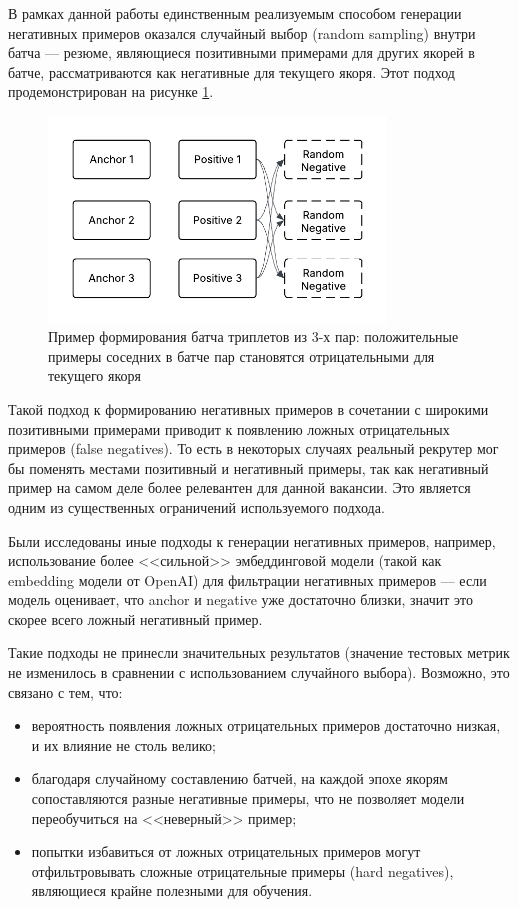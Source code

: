 \documentclass[14pt]{mmcs_article}
\begin{document}
В рамках данной работы единственным реализуемым способом генерации негативных примеров оказался случайный выбор (random sampling) внутри батча --- резюме, являющиеся позитивными примерами для других якорей в батче, рассматриваются как негативные для текущего якоря. Этот подход продемонстрирован на рисунке \ref{fig:batch_triplets}.

\begin{figure}[h]
  \centering
  \includegraphics[width=0.8\textwidth]{plots/batch_triplets.pdf}
  \caption{\centering Пример формирования батча триплетов из 3-х пар: положительные примеры соседних в батче пар становятся отрицательными для текущего якоря}
  \label{fig:batch_triplets}
\end{figure}

Такой подход к формированию негативных примеров в сочетании с широкими позитивными примерами приводит к появлению ложных отрицательных примеров (false negatives). То есть в некоторых случаях реальный рекрутер мог бы поменять местами позитивный и негативный примеры, так как негативный пример на самом деле более релевантен для данной вакансии. Это является одним из существенных ограничений используемого подхода.

Были исследованы иные подходы к генерации негативных примеров, например, использование более <<сильной>> эмбеддинговой модели (такой как embedding модели от OpenAI) для фильтрации негативных примеров --- если модель оценивает, что anchor и negative уже достаточно близки, значит это скорее всего ложный негативный пример.

Такие подходы не принесли значительных результатов (значение тестовых метрик не изменилось в сравнении с использованием случайного выбора). Возможно, это связано с тем, что:

\begin{itemize}
  \item вероятность появления ложных отрицательных примеров достаточно низкая, и их влияние не столь велико;
  \item благодаря случайному составлению батчей, на каждой эпохе якорям сопоставляются разные негативные примеры, что не позволяет модели переобучиться на <<неверный>> пример;
  \item попытки избавиться от ложных отрицательных примеров могут отфильтровывать сложные отрицательные примеры (hard negatives), являющиеся крайне полезными для обучения.
\end{itemize}
\end{document}
